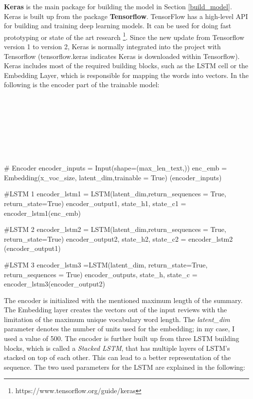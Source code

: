 \textbf{Keras} is the main package for building the model in Section \ref{build_model}. Keras is built up from the package \textbf{Tensorflow}. TensorFlow has a high-level API for building and training deep learning models. It can be used for doing fast prototyping or state of the art research \footnote{https://www.tensorflow.org/guide/keras}. Since the new update from Tensorflow version 1 to version 2, Keras is normally integrated into the project with Tensorflow (tensorflow.keras indicates Keras is downloaded within Tensorflow). Keras includes most of the required building blocks, such as the LSTM cell or the Embedding Layer, which is responsible for mapping the words into vectors. In the following is the encoder part of the trainable model: \\ \\ \\ \\ \\ \\ \\ \\


\begin{python}[caption={Encoder in Python}]
# Encoder 
encoder_inputs = Input(shape=(max_len_text,)) 
enc_emb = Embedding(x_voc_size, latent_dim,trainable = True)
(encoder_inputs) 

#LSTM 1 
encoder_lstm1 = LSTM(latent_dim,return_sequences = True, return_state=True) 
encoder_output1, state_h1, state_c1 = encoder_lstm1(enc_emb) 

#LSTM 2 
encoder_lstm2 = LSTM(latent_dim,return_sequences = True, return_state=True) 
encoder_output2, state_h2, state_c2 = encoder_lstm2
(encoder_output1) 

#LSTM 3 
encoder_lstm3  =LSTM(latent_dim, return_state=True, 
return_sequences = True) 
encoder_outputs, state_h, state_c = encoder_lstm3(encoder_output2) 
\end{python}

The encoder is initialized with the mentioned maximum length of the summary. The Embedding layer creates the vectors out of the input reviews with the limitation of the maximum unique vocabulary word length. The \textit{latent\_dim} parameter denotes the number of units used for the embedding; in my case, I used a value of 500. The encoder is further built up from three LSTM building blocks, which is called a \textit{Stacked LSTM}, that has multiple layers of LSTM's stacked on top of each other. This can lead to a better representation of the sequence. The two used parameters for the LSTM are explained in the following:

